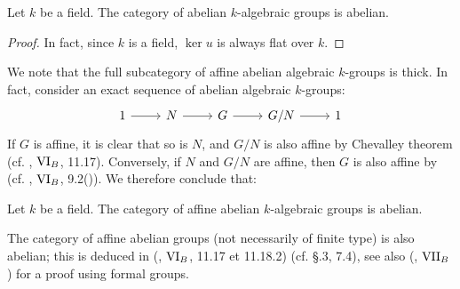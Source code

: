\begin{theorem}\label{scheme abelian k-algebraic group cat is abelian}
Let $k$ be a field. The category of abelian $k$-algebraic groups is abelian.
\end{theorem}
\begin{proof}
In fact, since $k$ is a field, $\ker u$ is always flat over $k$.
\end{proof}

We note that the full subcategory of affine abelian algebraic $k$-groups is thick. In fact, consider an exact sequence of abelian algebraic $k$-groups:
\[\begin{tikzcd}
1\ar[r]&N\ar[r]&G\ar[r]&G/N\ar[r]&1
\end{tikzcd}\]
If $G$ is affine, it is clear that so is $N$, and $G/N$ is also affine by Chevalley theorem (cf. \cite{SGA3-1}, $\Rmnum{6}_B$, 11.17). Conversely, if $N$ and $G/N$ are affine, then $G$ is also affine by (cf. \cite{SGA3-1}, $\Rmnum{6}_B$, 9.2()). We therefore conclude that:

\begin{corollary}\label{scheme affine abelian k-algebraic group cat is abelian}
Let $k$ be a field. The category of affine abelian $k$-algebraic groups is abelian.
\end{corollary}

\begin{remark}
The category of affine abelian groups (not necessarily of finite type) is also abelian; this is deduced in (\cite{SGA3-1}, $\Rmnum{6}_B$, 11.17 et 11.18.2) (cf. \cite{Demazure} \S{}.3, 7.4), see also (\cite{SGA3-1}, $\Rmnum{7}_B$) for a proof using formal groups.
\end{remark}

